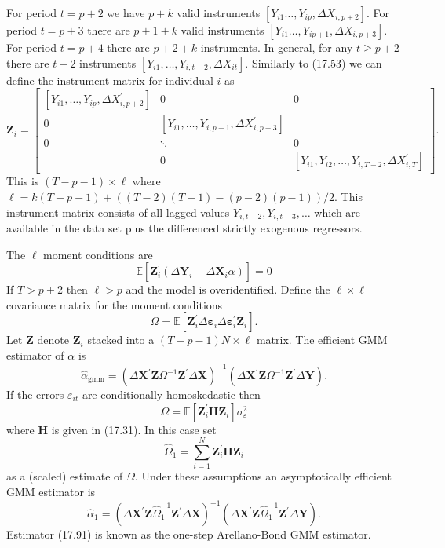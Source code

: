 \documentclass[10pt]{article}
\begin{document}
For period $t=p+2$ we have $p+k$ valid instruments $\left[Y_{i 1} \ldots, Y_{i p}, \Delta X_{i, p+2}\right]$. For period $t=p+3$ there are $p+1+k$ valid instruments $\left[Y_{i 1} \ldots, Y_{i p+1}, \Delta X_{i, p+3}\right]$. For period $t=p+4$ there are $p+2+k$ instruments. In general, for any $t \geq p+2$ there are $t-2$ instruments $\left[Y_{i 1}, \ldots, Y_{i, t-2}, \Delta X_{i t}\right]$. Similarly to (17.53) we can define the instrument matrix for individual $i$ as
$$
\boldsymbol{Z}_{i}=\left[\begin{array}{ccc}
{\left[Y_{i 1}, \ldots, Y_{i p}, \Delta X_{i, p+2}^{\prime}\right]} & 0 & 0 \\
0 & {\left[Y_{i 1}, \ldots, Y_{i, p+1}, \Delta X_{i, p+3}^{\prime}\right]} & \\
0 & \ddots & 0 \\
& 0 & {\left[Y_{i 1}, Y_{i 2}, \ldots, Y_{i, T-2}, \Delta X_{i, T}^{\prime}\right]}
\end{array}\right] .
$$
This is $(T-p-1) \times \ell$ where $\ell=k(T-p-1)+((T-2)(T-1)-(p-2)(p-1)) / 2$. This instrument matrix consists of all lagged values $Y_{i, t-2}, Y_{i, t-3}, \ldots$ which are available in the data set plus the differenced strictly exogenous regressors.

The $\ell$ moment conditions are
$$
\mathbb{E}\left[\boldsymbol{Z}_{i}^{\prime}\left(\Delta \boldsymbol{Y}_{i}-\Delta \boldsymbol{X}_{i} \alpha\right)\right]=0
$$
If $T>p+2$ then $\ell>p$ and the model is overidentified. Define the $\ell \times \ell$ covariance matrix for the moment conditions
$$
\Omega=\mathbb{E}\left[\boldsymbol{Z}_{i}^{\prime} \Delta \boldsymbol{\varepsilon}_{i} \Delta \boldsymbol{\varepsilon}_{i}^{\prime} \boldsymbol{Z}_{i}\right] .
$$
Let $\boldsymbol{Z}$ denote $\boldsymbol{Z}_{i}$ stacked into a $(T-p-1) N \times \ell$ matrix. The efficient GMM estimator of $\alpha$ is
$$
\widehat{\alpha}_{\mathrm{gmm}}=\left(\Delta \boldsymbol{X}^{\prime} \boldsymbol{Z} \Omega^{-1} \boldsymbol{Z}^{\prime} \Delta \boldsymbol{X}\right)^{-1}\left(\Delta \boldsymbol{X}^{\prime} \boldsymbol{Z} \Omega^{-1} \boldsymbol{Z}^{\prime} \Delta \boldsymbol{Y}\right) .
$$
If the errors $\varepsilon_{i t}$ are conditionally homoskedastic then
$$
\Omega=\mathbb{E}\left[\boldsymbol{Z}_{i}^{\prime} \boldsymbol{H} \boldsymbol{Z}_{i}\right] \sigma_{\varepsilon}^{2}
$$
where $\boldsymbol{H}$ is given in (17.31). In this case set
$$
\widehat{\Omega}_{1}=\sum_{i=1}^{N} \boldsymbol{Z}_{i}^{\prime} \boldsymbol{H} \boldsymbol{Z}_{i}
$$
as a (scaled) estimate of $\Omega$. Under these assumptions an asymptotically efficient GMM estimator is
$$
\widehat{\alpha}_{1}=\left(\Delta \boldsymbol{X}^{\prime} \boldsymbol{Z} \widehat{\Omega}_{1}^{-1} \boldsymbol{Z}^{\prime} \Delta \boldsymbol{X}\right)^{-1}\left(\Delta \boldsymbol{X}^{\prime} \boldsymbol{Z} \widehat{\Omega}_{1}^{-1} \boldsymbol{Z}^{\prime} \Delta \boldsymbol{Y}\right) .
$$
Estimator (17.91) is known as the one-step Arellano-Bond GMM estimator.
\end{document}
